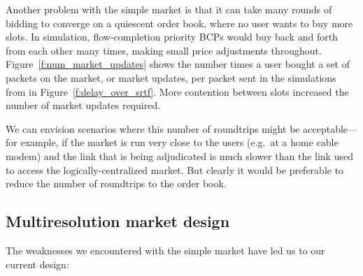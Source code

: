 Another problem with the simple market is that it can take many rounds
of bidding
to converge on a quiescent order book, where no user wants to buy more slots. In
simulation, flow-completion priority BCPs would buy back and forth from each other many times, making small price adjustments throughout.  
Figure~\ref{f:num_market_updates} shows the number times a user bought a set of packets on the market, or market updates, per packet sent in the simulations from in Figure~\ref{f:delay_over_srtf}.
More contention between slots increased the number of market updates
required.

We can envision scenarios where this number of roundtrips might be
acceptable---for example, if the market is run very close to the users
(e.g.~at a home cable modem) and the link that is being adjudicated is
much slower than the link used to access the logically-centralized
market. But clearly it would be preferable to reduce the number of
roundtrips to the order book.

\subsection{Multiresolution market design}
\label{ss:multires}
The weaknesses we encountered with the simple market have led us to our current design:

